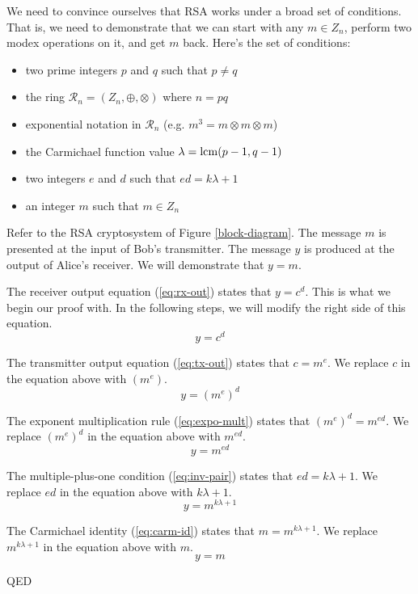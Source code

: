 
We need to convince ourselves that RSA works under a broad set of conditions.
That is, we need to demonstrate that we can start with any $m \in Z_n$,
perform two modex operations on it, and get $m$ back.
Here's the set of conditions:
\begin{itemize}
\item  two prime integers $p$ and $q$ such that $p \ne q$
\item  the ring $\mathcal{R}_n = (Z_n,\oplus,\otimes)$ where $n=pq$
\item  exponential notation in $\mathcal{R}_n$  (e.g. $m^3 = m \otimes m \otimes m$)
\item  the Carmichael function value $\lambda=\mathrm{lcm}(p-1,q-1)$
\item  two integers $e$ and $d$ such that $ed=k\lambda + 1$
\item  an integer $m$ such that $m \in Z_n$
\end{itemize}

Refer to the RSA cryptosystem of Figure \ref{block-diagram}.
The message $m$ is presented at the input of Bob's transmitter.
The message $y$ is produced at the output of Alice's receiver.
We will demonstrate that $y=m$.

The receiver output equation (\ref{eq:rx-out}) states that $y=c^d$.
This is what we begin our proof with.
In the following steps, we will modify the right side of this equation.
\[  y = c^d  \]

The transmitter output equation (\ref{eq:tx-out}) states that $c=m^e$.
We replace $c$ in the equation above with $(m^e)$.
\[  y = (m^e)^d  \]

The exponent multiplication rule (\ref{eq:expo-mult}) states that $(m^e)^d=m^{ed}$.
We replace $(m^e)^d$ in the equation above with $m^{ed}$.
\[  y = m^{ed}  \]

The multiple-plus-one condition (\ref{eq:inv-pair}) states that $ed=k\lambda + 1$.
We replace $ed$ in the equation above with $k\lambda + 1$.
\[  y = m^{k\lambda + 1}  \]

The Carmichael identity (\ref{eq:carm-id}) states that $m=m^{k\lambda + 1}$.
We replace $m^{k\lambda + 1}$ in the equation above with $m$.
\[  y = m  \]

QED

